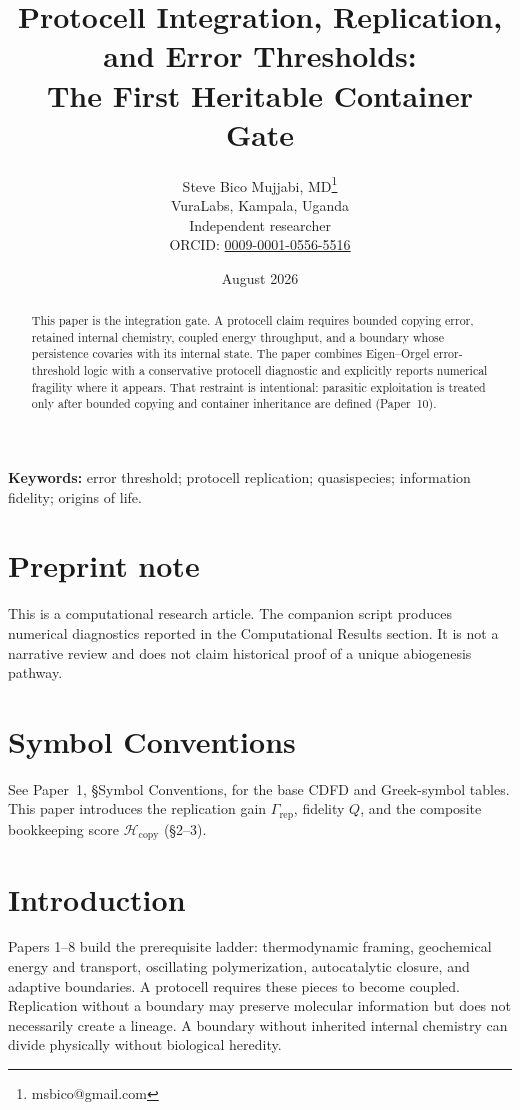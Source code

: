 \documentclass[11pt,a4paper]{article}
\title{Protocell Integration, Replication, and Error Thresholds:\\ The First Heritable Container Gate}
\author{Steve Bico Mujjabi, MD\thanks{msbico@gmail.com}\\
VuraLabs, Kampala, Uganda\\
Independent researcher\\
ORCID: \href{https://orcid.org/0009-0001-0556-5516}{0009-0001-0556-5516}}
\date{August 2026}
\begin{document}
\maketitle

\begin{abstract}
This paper is the integration gate. A protocell claim requires bounded copying error, retained internal chemistry, coupled energy throughput, and a boundary whose persistence covaries with its internal state. The paper combines Eigen--Orgel error-threshold logic with a conservative protocell diagnostic and explicitly reports numerical fragility where it appears. That restraint is intentional: parasitic exploitation is treated only after bounded copying and container inheritance are defined (Paper~10).
\end{abstract}

\noindent\textbf{Keywords:} error threshold; protocell replication; quasispecies; information fidelity; origins of life.

\section*{Preprint note}
This is a computational research article. The companion script produces numerical diagnostics reported in the Computational Results section. It is not a narrative review and does not claim historical proof of a unique abiogenesis pathway.

\section*{Symbol Conventions}

\noindent See Paper~1, \S Symbol Conventions, for the base CDFD and Greek-symbol tables. This paper introduces the replication gain $\Gamma_{\mathrm{rep}}$, fidelity $Q$, and the composite bookkeeping score $\mathcal{H}_{\mathrm{copy}}$ (\S2--3).

\section{Introduction}
Papers 1--8 build the prerequisite ladder: thermodynamic framing, geochemical energy and transport, oscillating polymerization, autocatalytic closure, and adaptive boundaries. A protocell requires these pieces to become coupled. Replication without a boundary may preserve molecular information but does not necessarily create a lineage. A boundary without inherited internal chemistry can divide physically without biological heredity.
\end{document}
